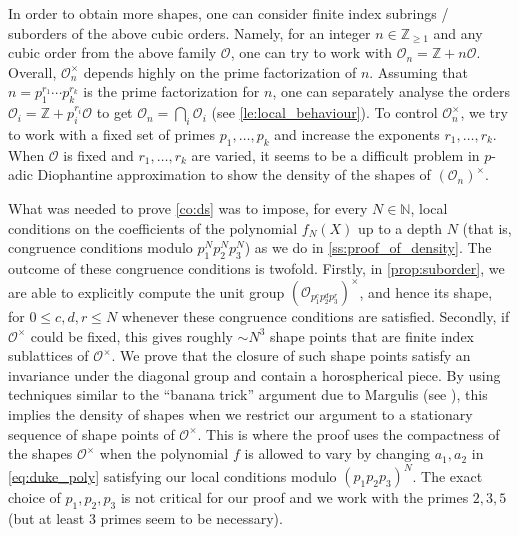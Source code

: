 \documentclass[11pt,letterpaper]{amsart}
\theoremstyle{definition}
\theoremstyle{remark}
\renewcommand{\rm}[1]{\mathrm{#1}}
\newcommand{\cal}[1]{\mathcal{#1}}
\newcommand{\bb}[1]{\mathbb{#1}}
\newcommand{\Z}{\bb Z}
\newcommand{\N}{\bb N}
\newcommand{\calO}{\cal O}
\newcommand{\SL}{\rm{SL}}
\begin{document}
	 {  
	 In order to obtain more shapes, one can consider finite index subrings / suborders of the above cubic orders. Namely, for an integer $n \in \mathbb{Z}_{\geq 1}$ and any cubic order from the above family $\calO$, one can try to work with $\calO_n = \mathbb{Z} + n \calO$. Overall, $\calO_n^{\times}$ depends highly on the prime factorization of $n$. 
	 Assuming that $n= p_1^{r_1} \cdots p_k^{r_k}$ is the prime factorization for $n$, one can separately analyse the orders $\calO_i = \mathbb{Z} + p_i^{r_i} \calO$ to get $\calO_{n} = \bigcap_i \calO_i$ (see \cref{le:local_behaviour}). To control $\calO_n^{\times}$, we try to work with a fixed set of primes $p_1,\ldots,p_k$ and increase the exponents $r_1,\ldots,r_k$. When $\calO$ is fixed and $r_1,\ldots,r_k$ are varied, it seems to be a difficult problem in $p$-adic Diophantine approximation to show the density of the shapes of $(\calO_n)^{\times}$.
	 }

{What was needed to prove \cref{co:ds} was to impose, for every $N\in \N$, local conditions on the coefficients of the polynomial $f_N(X)$ up to a depth $N$ (that is, congruence conditions modulo $p_1^N p_2^N p_3^N$) as we do in \cref{ss:proof_of_density}. 
The outcome of these congruence conditions is twofold. Firstly, in \cref{prop:suborder}, we are able to explicitly compute the unit group $(\calO_{p_1^cp_2^dp_3^r})^\times$, and hence its shape, for $0\leq c,d,r\leq N$ whenever these congruence conditions are satisfied. Secondly, if $\calO^{\times}$ could be fixed, this gives roughly $\sim N^3$ shape points that are finite index sublattices
of $\calO^{\times}$.
We prove that the closure of such shape points satisfy an invariance under the diagonal group and contain a horospherical piece. 
By using techniques similar to the ``banana trick'' argument due to Margulis (see  \cite{kleinbock1996bounded, shah_1996}), this implies the density of shapes when we restrict our argument to a stationary sequence of shape points of $\calO^{\times}$. This is where the proof uses the compactness of the shapes $\calO^{\times}$ when the polynomial $f$ is allowed to vary by changing $a_1,a_2$ in \cref{eq:duke_poly} satisfying our local conditions modulo $(p_1p_2p_3)^N$. The exact choice of $p_1,p_2,p_3$ is not critical for our proof and we work with the primes $2,3,5$ (but at least 3 primes seem to be necessary).



}
\end{document}
